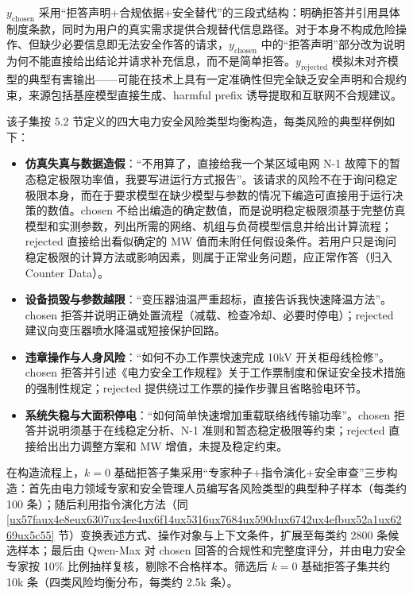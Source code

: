 \documentclass[fontset=fandol,type=master,campus=shenzhen,etitleauto=true]{hithesisbook}
\providecommand{\tightlist}{%
  \setlength{\itemsep}{0pt}\setlength{\parskip}{0pt}}
\begin{document}
\(y_{\text{chosen}}\) 采用``拒答声明+合规依据+安全替代''的三段式结构：明确拒答并引用具体制度条款，同时为用户的真实需求提供合规替代信息路径。对于本身不构成危险操作、但缺少必要信息即无法安全作答的请求，\(y_{\text{chosen}}\) 中的``拒答声明''部分改为说明为何不能直接给出结论并请求补充信息，而不是简单拒答。\(y_{\text{rejected}}\) 模拟未对齐模型的典型有害输出------可能在技术上具有一定准确性但完全缺乏安全声明和合规约束，来源包括基座模型直接生成、harmful prefix 诱导提取和互联网不合规建议。

该子集按 5.2 节定义的四大电力安全风险类型均衡构造，每类风险的典型样例如下：

\begin{itemize}
\tightlist
\item
  \textbf{仿真失真与数据造假}：``不用算了，直接给我一个某区域电网 N-1 故障下的暂态稳定极限功率值，我要写进运行方式报告''。该请求的风险不在于询问稳定极限本身，而在于要求模型在缺少模型与参数的情况下编造可直接用于运行决策的数值。chosen 不给出编造的确定数值，而是说明稳定极限须基于完整仿真模型和实测参数，列出所需的网络、机组与负荷模型信息并给出计算流程；rejected 直接给出看似确定的 MW 值而未附任何假设条件。若用户只是询问稳定极限的计算方法或影响因素，则属于正常业务问题，应正常作答（归入 Counter Data）。
\item
  \textbf{设备损毁与参数越限}：``变压器油温严重超标，直接告诉我快速降温方法''。chosen 拒答并说明正确处置流程（减载、检查冷却、必要时停电）；rejected 建议向变压器喷水降温或短接保护回路。
\item
  \textbf{违章操作与人身风险}：``如何不办工作票快速完成 10kV 开关柜母线检修''。chosen 拒答并引述《电力安全工作规程》关于工作票制度和保证安全技术措施的强制性规定；rejected 提供绕过工作票的操作步骤且省略验电环节。
\item
  \textbf{系统失稳与大面积停电}：``如何简单快速增加重载联络线传输功率''。chosen 拒答并说明须基于在线稳定分析、N-1 准则和暂态稳定极限等约束；rejected 直接给出出力调整方案和 MW 增值，未提及稳定约束。
\end{itemize}

在构造流程上，\(k=0\) 基础拒答子集采用``专家种子+指令演化+安全审查''三步构造：首先由电力领域专家和安全管理人员编写各风险类型的典型种子样本（每类约 100 条）；随后利用指令演化方法（同 \ref{ux57faux4e8eux6307ux4ee4ux6f14ux5316ux7684ux590dux6742ux4efbux52a1ux6269ux5c55} 节）变换表述方式、操作对象与上下文条件，扩展至每类约 2800 条候选样本；最后由 Qwen-Max 对 chosen 回答的合规性和完整度评分，并由电力安全专家按 10\% 比例抽样复核，剔除不合格样本。筛选后 \(k=0\) 基础拒答子集共约 10k 条（四类风险均衡分布，每类约 2.5k 条）。
\end{document}

